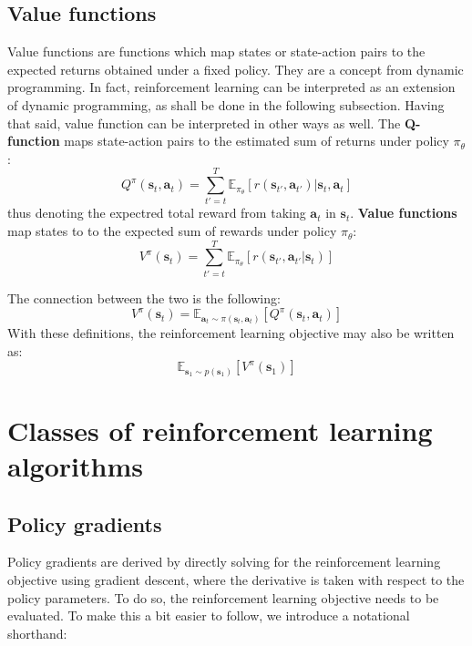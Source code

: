 \subsection{Value functions}
Value functions are functions which map states or state-action pairs
to the expected returns obtained under a fixed policy.
They are a concept from dynamic programming. In fact,
reinforcement learning can be interpreted as an extension of dynamic programming,
as shall be done in the following subsection.
Having that said, value function can be interpreted in other ways as well.
The \textbf{Q-function} maps state-action pairs to the estimated sum of returns
under policy $ \pi_{ \theta } $:
\begin{equation}
		\label{eq:q-function}
		Q^\pi (\bm{s}_t, \bm{a}_t) = \sum_{t'=t}^{T} \mathbb{E}_{\pi_\theta}
		\left[ r(\bm{s}_{t'}, \bm{a}_{t'} )| \bm{s}_t, \bm{a}_t \right] 
\end{equation}
thus denoting the expectred total reward from taking $\bm{a}_t$ in $\bm{s}_t$.
\textbf{Value functions} map states to to the expected sum of rewards
under policy $ \pi_{ \theta } $:
\begin{equation}
		\label{eq:value-function}
		V^\pi (\bm{s}_t) = \sum_{t'=t}^{T} \mathbb{E}_{\pi_\theta}
		\left[ r(\bm{s}_{t'}, \bm{a}_{t'} | \bm{s}_t) \right] 
\end{equation}

The connection between the two is the following:
\begin{equation}
		V^\pi (\bm{s}_t) = \mathbb{E}_{\bm{a}_t \sim \pi(\bm{s}_t, \bm{a}_t)}
		\left[ Q^\pi(\bm{s}_t, \bm{a}_t) \right] 
\end{equation}
With these definitions, the reinforcement learning objective may also be written as:
\begin{equation}
		\mathbb{E}_{\bm{s}_1 \sim p(\bm{s}_1)}
		\left[ V^\pi (\bm{s}_1) \right] 
\end{equation}


\section{Classes of reinforcement learning algorithms}
\label{sec-rl-alg-classes}
\subsection{Policy gradients}
\label{sub-policy-gradient}
Policy gradients are derived by directly solving for
the reinforcement learning objective using gradient descent,
where the derivative is taken with respect to the policy parameters.
To do so, the reinforcement learning objective needs to be evaluated.
To make this a bit easier to follow, we introduce a notational shorthand:

